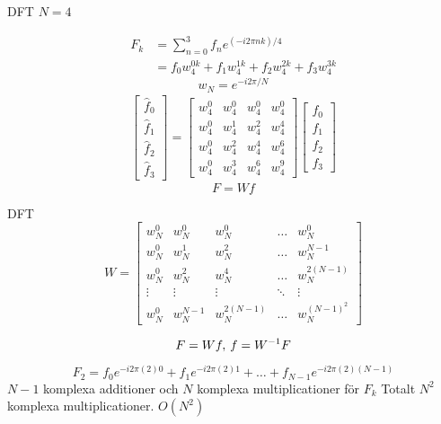 \documentclass[presentation]{beamer}
\begin{document}
\begin{frame}[label={sec:org49763a4}]{DFT}
\(N = 4\)

\begin{align*}
  F_{k} &= \sum_{n=0}^{3} f_{n} e^{(-i2 \pi nk)/4} \\
  &= f_{0}w_{4}^{0k} + f_{1}w_{4}^{1k} + f_{2}w_{4}^{2k} + f_{3}w_{4}^{3k}
\end{align*}
\begin{equation*}
w_{N} = e^{-i2 \pi/N}
\end{equation*}
\pause
\begin{gather*}
  \begin{bmatrix}
    \hat{f}_{0} \\
    \hat{f}_{1} \\
    \hat{f}_{2} \\
    \hat{f}_{3}
    \end{bmatrix}
=
\begin{bmatrix}
  w_{4}^{0} & w_{4}^{0} & w_{4}^{0} & w_{4}^{0} \\
  w_{4}^{0} & w_{4}^{1} & w_{4}^{2} & w_{4}^{4} \\
  w_{4}^{0} & w_{4}^{2} & w_{4}^{4} & w_{4}^{6} \\
  w_{4}^{0} & w_{4}^{3} & w_{4}^{6} & w_{4}^{9}
\end{bmatrix}
  \begin{bmatrix}
    f_{0} \\
    f_{1} \\
    f_{2} \\
    f_{3}
    \end{bmatrix}
\end{gather*}
\begin{equation*}
F = Wf
\end{equation*}
\end{frame}

\begin{frame}[label={sec:org7eb7aa8}]{DFT}
\begin{equation*}
W =
\begin{bmatrix}
  w_{N}^{0} & w_{N}^{0} & w_{N}^{0} & \dots & w_{N}^{0} \\
  w_{N}^{0} & w_{N}^{1} & w_{N}^{2} & \dots & w_{N}^{N-1} \\
  w_{N}^{0} & w_{N}^{2} & w_{N}^{4} & \dots & w_{N}^{2(N-1)} \\
  \vdots & \vdots & \vdots       & \ddots & \vdots \\  
  w_{N}^{0} & w_{N}^{N-1} & w_{N}^{2(N-1)} & \dots & w_{N}^{(N-1)^{2}}
\end{bmatrix}
\end{equation*}

\begin{equation*}
F = Wf,  \hspace{0.2em} f = W^{-1}F
\end{equation*}

\begin{equation*}
F_{2} = f_{0}e^{-i2 \pi (2)0} + f_{1}e^{-i2 \pi (2)1} + \dots + f_{N-1}e^{-i2 \pi (2)(N-1)}
\end{equation*}
\(N - 1\) komplexa additioner och \(N\) komplexa multiplicationer för \(F_{k}\)
Totalt \(N^{2}\) komplexa multiplicationer. \(O(N^{2})\)
\end{frame}
\end{document}
